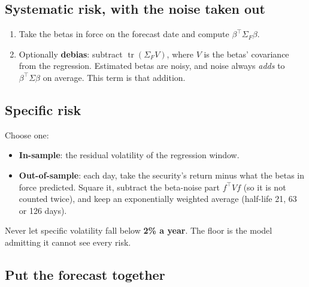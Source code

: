 \documentclass[11pt,a4paper]{article}
\begin{document}
\subsection{Systematic risk, with the noise taken out}

\begin{method}
\begin{enumerate}[leftmargin=1.4em]
  \item Take the betas in force on the forecast date and compute $\beta^{\top}\Sigma_F\beta$.
  \item Optionally \textbf{debias}: subtract $\operatorname{tr}(\Sigma_F V)$, where $V$ is the betas' covariance from the regression. Estimated betas are noisy, and noise always \emph{adds} to $\beta^{\top}\Sigma\beta$ on average. This term is that addition.
\end{enumerate}
\end{method}

\subsection{Specific risk}

\begin{method}
Choose one:
\begin{itemize}[leftmargin=1.2em]
  \item \textbf{In-sample}: the residual volatility of the regression window.
  \item \textbf{Out-of-sample}: each day, take the security's return minus what the betas in force predicted. Square it, subtract the beta-noise part $f^{\top}Vf$ (so it is not counted twice), and keep an exponentially weighted average (half-life 21, 63 or 126 days).
\end{itemize}
Never let specific volatility fall below \textbf{2\% a year}. The floor is the model
admitting it cannot see every risk.
\end{method}

\subsection{Put the forecast together}
\end{document}
